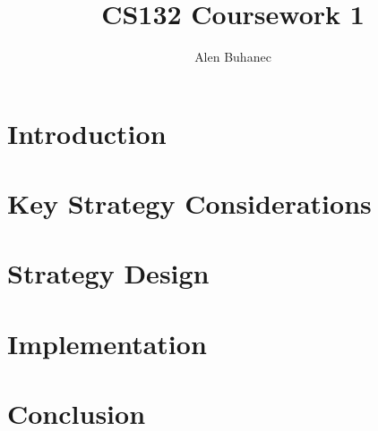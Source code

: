 \documentclass[11pt]{article} %
\title{CS132 Coursework 1}
\author{Alen Buhanec}
\date{}
\begin{document}
\maketitle
\tableofcontents
\chapter{Introduction}
\chapter{Key Strategy Considerations}
\chapter{Strategy Design}
\chapter{Implementation}
\chapter{Conclusion}
\end{document}
